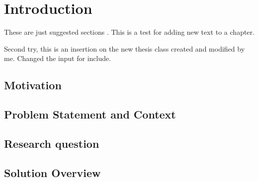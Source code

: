 \chapter{Introduction}
\label{chapter:chapter01}

These are just suggested sections \cite{greenwade93}. This is a test for adding new text to a chapter.

Second try, this is an insertion on the new thesis class created and modified by me. Changed the input for include.

\section{Motivation}

\section{Problem Statement and Context}

\section{Research question}

\section{Solution Overview}

